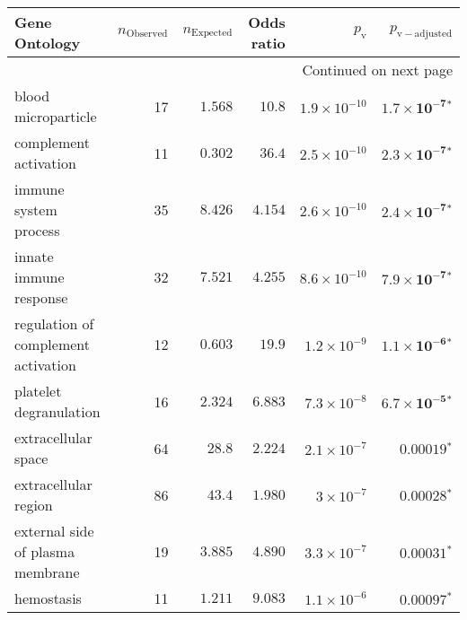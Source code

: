 \begin{longtable}{|l|r|r|r|r|r|}
\toprule
                                     Gene Ontology & $n_{\mathrm{Observed}}$ & $n_{\mathrm{Expected}}$ & Odds ratio &     $p_{\mathrm{v}}$ &     $p_{\mathrm{v-adjusted}}$ \\
\midrule
\endhead
\midrule
\multicolumn{6}{r}{{Continued on next page}} \\
\midrule
\endfoot

\bottomrule
\endlastfoot
                               blood microparticle &                      17 &                $ 1.568$ &   $  10.8$ & $1.9\times 10^{-10}$ &  $\bm{1.7\times 10^{-7}{^*}}$ \\
                             complement activation &                      11 &                $ 0.302$ &   $  36.4$ & $2.5\times 10^{-10}$ &  $\bm{2.3\times 10^{-7}{^*}}$ \\
                             immune system process &                      35 &                $ 8.426$ &   $ 4.154$ & $2.6\times 10^{-10}$ &  $\bm{2.4\times 10^{-7}{^*}}$ \\
                            innate immune response &                      32 &                $ 7.521$ &   $ 4.255$ & $8.6\times 10^{-10}$ &  $\bm{7.9\times 10^{-7}{^*}}$ \\
               regulation of complement activation &                      12 &                $ 0.603$ &   $  19.9$ &  $1.2\times 10^{-9}$ &  $\bm{1.1\times 10^{-6}{^*}}$ \\
                            platelet degranulation &                      16 &                $ 2.324$ &   $ 6.883$ &  $7.3\times 10^{-8}$ &  $\bm{6.7\times 10^{-5}{^*}}$ \\
                               extracellular space &                      64 &                $  28.8$ &   $ 2.224$ &  $2.1\times 10^{-7}$ &            $\bm{0.00019{^*}}$ \\
                              extracellular region &                      86 &                $  43.4$ &   $ 1.980$ &   $ 3\times 10^{-7}$ &            $\bm{0.00028{^*}}$ \\
                  external side of plasma membrane &                      19 &                $ 3.885$ &   $ 4.890$ &  $3.3\times 10^{-7}$ &            $\bm{0.00031{^*}}$ \\
                                        hemostasis &                      11 &                $ 1.211$ &   $ 9.083$ &  $1.1\times 10^{-6}$ &            $\bm{0.00097{^*}}$ \\

\end{longtable}
